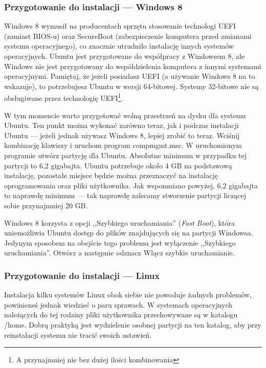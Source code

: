 \subsubsection{Przygotowanie do instalacji --- Windows 8}
\label{sec:przygotowanie_windows8}
Windows 8 wymusił na producentach sprzętu stosowanie technologi UEFI (zamiast BIOS-u) oraz SecureBoot (zabezpieczenie komputera przed zmianami systemu operacyjnego), co znacznie utrudniło instalację innych systemów operacyjnych. Ubuntu jest przygotowane do współpracy z Windowsem 8, ale Windows nie jest przygotowany do współdzielenia komputera z innymi systemami operacyjnymi. Pamiętaj, że jeżeli posiadasz UEFI (a używanie Windows 8 na to wskazuje), to potrzebujesz Ubuntu w wersji 64-bitowej. Systemy 32-bitowe nie są obsługiwane przez technologię UEFI\footnote{A przynajmniej nie bez dużej ilości kombinowania}.

W tym momencie warto przygotować wolną przestrzeń na dysku dla systemu Ubuntu. Ten punkt można wykonać zarówno teraz, jak i podczas instalacji Ubuntu --- jeżeli jednak używasz Windows 8, lepiej zrobić to teraz. Wciśnij kombinację klawiszy  i uruchom program \textcolor{ubuntu_orange}{compmgmt.msc}. W uruchomionym programie utwórz partycję dla Ubuntu. Absolutne minimum w przypadku tej partycji to 6,2 gigabajta. Ubuntu potrzebuje około 4 GB na podstawową instalację, pozostałe miejsce będzie można przeznaczyć na instalację oprogramowania oraz pliki użytkownika. Jak wspomniano powyżej, 6,2 gigabajta to naprawdę minimum --- tak naprawdę zalecamy stworzenie partycji liczącej sobie przynajmniej 20 GB.

Windows 8 korzysta z opcji ,,Szybkiego uruchamiania'' (\textit{Fast Boot}), która uniemożliwia Ubuntu dostęp do plików znajdujących się na partycji Windowsa. Jedynym sposobem na obejście tego problemu jest wyłączenie ,,Szybkiego uruchamiania''. Otwórz  a następnie odznacz \textcolor{ubuntu_orange}{Włącz szybkie uruchamianie}.
\subsubsection{Przygotowanie do instalacji --- Linux}
\label{sec:przygotowanie_linux}
Instalacja kilku systemów Linux obok siebie nie powoduje żadnych problemów, powinieneś jednak wiedzieć o paru sprawach. W systemach operacyjnych należących do tej rodziny pliki użytkownika przechowywane są w katalogu /home. Dobrą praktyką jest wydzielenie osobnej partycji na ten katalog, aby przy reinstalacji systemu nie tracić swoich ustawień.

